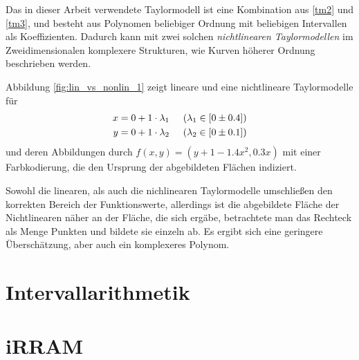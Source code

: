 Das in dieser Arbeit verwendete Taylormodell ist eine Kombination aus \ref{tm2} und \ref{tm3}, und besteht aus Polynomen beliebiger Ordnung mit beliebigen Intervallen als Koeffizienten. Dadurch kann mit zwei solchen \textit{nichtlinearen Taylormodellen} im Zweidimensionalen komplexere Strukturen, wie Kurven höherer Ordnung beschrieben werden.

Abbildung \ref{fig:lin_vs_nonlin_1} zeigt lineare und eine nichtlineare Taylormodelle für
\begin{align*}
x = 0 + 1 \cdot \lambda_1 & \hspace{0.5cm} (\lambda_1 \in [0 \pm 0.4]) \\
 y = 0 + 1 \cdot \lambda_2 & \hspace{0.5cm} (\lambda_2 \in [0 \pm 0.1])
\end{align*}
und deren Abbildungen durch $f(x,y) = (y + 1- 1.4 x^2,0.3x)$ mit einer Farbkodierung, die den Ursprung der abgebildeten Flächen indiziert.


Sowohl die linearen, als auch die nichlinearen Taylormodelle umschließen den korrekten Bereich der Funktionswerte, allerdings ist die abgebildete Fläche der Nichtlinearen näher an der Fläche, die sich ergäbe, betrachtete man das Rechteck als Menge Punkten und bildete sie einzeln ab. Es ergibt sich eine geringere Überschätzung, aber auch ein komplexeres Polynom.

\section{Intervallarithmetik}


\section{iRRAM}


 
